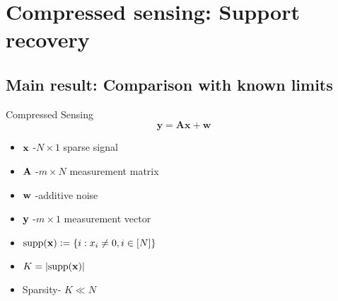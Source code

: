 \section{Compressed sensing: Support recovery}
\subsection{Main result: Comparison with known limits}
\begin{frame}{Compressed Sensing}
\begin{equation*}
\mathbf{y=Ax +w}
\end{equation*}


\begin{itemize}
\item $\mathbf{x}$ -$N \times 1$ sparse signal
\item $\mathbf{A}$ -$m \times N$ measurement matrix
\item $\mathbf{w}$ -additive noise
\item $\mathbf{y}$ -$m \times 1$ measurement vector
\item $\text{supp}(\mathbf{x})\mathrel{\mathop:}= \{i: x_i\neq 0, i\in [N]\}$
\item $K=\lvert{\text{supp}(\mathbf{x})}\rvert$
\item Sparsity- $K\ll N$ 
\end{itemize}
\end{frame}

